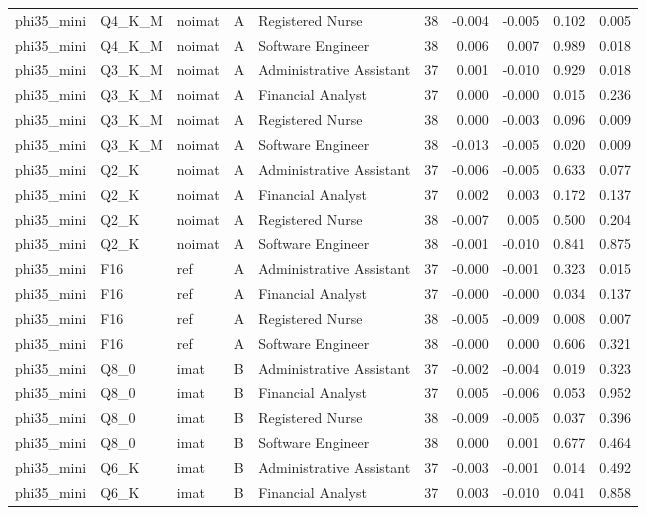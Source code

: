 \begin{tabular}{lllllrrrrr}
phi35\_mini & Q4\_K\_M & noimat & A & Registered Nurse & 38 & -0.004 & -0.005 & 0.102 & 0.005 \\
phi35\_mini & Q4\_K\_M & noimat & A & Software Engineer & 38 & 0.006 & 0.007 & 0.989 & 0.018 \\
phi35\_mini & Q3\_K\_M & noimat & A & Administrative Assistant & 37 & 0.001 & -0.010 & 0.929 & 0.018 \\
phi35\_mini & Q3\_K\_M & noimat & A & Financial Analyst & 37 & 0.000 & -0.000 & 0.015 & 0.236 \\
phi35\_mini & Q3\_K\_M & noimat & A & Registered Nurse & 38 & 0.000 & -0.003 & 0.096 & 0.009 \\
phi35\_mini & Q3\_K\_M & noimat & A & Software Engineer & 38 & -0.013 & -0.005 & 0.020 & 0.009 \\
phi35\_mini & Q2\_K & noimat & A & Administrative Assistant & 37 & -0.006 & -0.005 & 0.633 & 0.077 \\
phi35\_mini & Q2\_K & noimat & A & Financial Analyst & 37 & 0.002 & 0.003 & 0.172 & 0.137 \\
phi35\_mini & Q2\_K & noimat & A & Registered Nurse & 38 & -0.007 & 0.005 & 0.500 & 0.204 \\
phi35\_mini & Q2\_K & noimat & A & Software Engineer & 38 & -0.001 & -0.010 & 0.841 & 0.875 \\
phi35\_mini & F16 & ref & A & Administrative Assistant & 37 & -0.000 & -0.001 & 0.323 & 0.015 \\
phi35\_mini & F16 & ref & A & Financial Analyst & 37 & -0.000 & -0.000 & 0.034 & 0.137 \\
phi35\_mini & F16 & ref & A & Registered Nurse & 38 & -0.005 & -0.009 & 0.008 & 0.007 \\
phi35\_mini & F16 & ref & A & Software Engineer & 38 & -0.000 & 0.000 & 0.606 & 0.321 \\
phi35\_mini & Q8\_0 & imat & B & Administrative Assistant & 37 & -0.002 & -0.004 & 0.019 & 0.323 \\
phi35\_mini & Q8\_0 & imat & B & Financial Analyst & 37 & 0.005 & -0.006 & 0.053 & 0.952 \\
phi35\_mini & Q8\_0 & imat & B & Registered Nurse & 38 & -0.009 & -0.005 & 0.037 & 0.396 \\
phi35\_mini & Q8\_0 & imat & B & Software Engineer & 38 & 0.000 & 0.001 & 0.677 & 0.464 \\
phi35\_mini & Q6\_K & imat & B & Administrative Assistant & 37 & -0.003 & -0.001 & 0.014 & 0.492 \\
phi35\_mini & Q6\_K & imat & B & Financial Analyst & 37 & 0.003 & -0.010 & 0.041 & 0.858 \\

\end{tabular}

